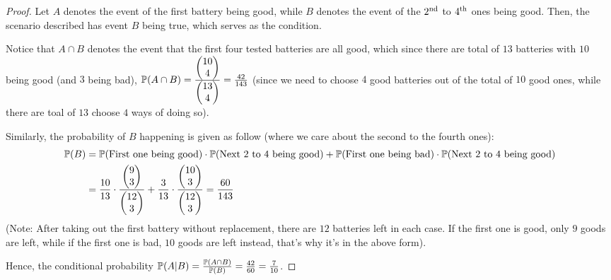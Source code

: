 \documentclass{article}
\begin{document}
\begin{proof}
    Let $A$ denotes the event of the first battery being good, while $B$ denotes the event of the $2^\textmd{nd}$ to $4^\textmd{th}$ ones being good. Then, the scenario described has event $B$ being true, which serves as the condition. 

    Notice that $A \cap B$ denotes the event that the first four tested batteries are all good, which since there are total of $13$ batteries with $10$ being good (and $3$ being bad), $\mathbb{P}(A\cap B) = \frac{\begin{pmatrix}10\\4\end{pmatrix}}{\begin{pmatrix}13\\4\end{pmatrix}}=\frac{42}{143}$ (since we need to choose $4$ good batteries out of the total of $10$ good ones, while there are toal of $13$ choose $4$ ways of doing so).

    Similarly, the probability of $B$ happening is given as follow (where we care about the second to the fourth ones):
    \begin{align}
        \mathbb{P}(B)&=\mathbb{P}(\textmd{First one being good}) \cdot \mathbb{P}(\textmd{Next 2 to 4 being good})+\mathbb{P}(\textmd{First one being bad})\cdot \mathbb{P}(\textmd{Next 2 to 4 being good})\\
        &= \frac{10}{13}\cdot \frac{\begin{pmatrix}9\\3\end{pmatrix}}{\begin{pmatrix}12\\3\end{pmatrix} }+\frac{3}{13}\cdot\frac{\begin{pmatrix}10\\3\end{pmatrix} }{\begin{pmatrix}12\\3\end{pmatrix}} = \frac{60}{143}
    \end{align}
    (Note: After taking out the first battery without replacement, there are $12$ batteries left in each case. If the first one is good, only $9$ goods are left, while if the first one is bad, $10$ goods are left instead, that's why it's in the above form).

    Hence, the conditional probability $\mathbb{P}(A|B)=\frac{\mathbb{P}(A\cap B)}{\mathbb{P}(B)}=\frac{42}{60}=\frac{7}{10}$.
\end{proof}
\end{document}
